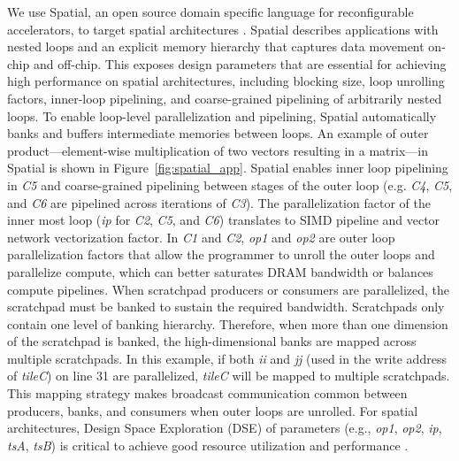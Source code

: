 We use Spatial, an open source domain specific language for reconfigurable accelerators, to target spatial architectures \cite{spatial_koeplinger}.
Spatial describes applications with nested loops and an explicit memory hierarchy that captures data movement on-chip and off-chip. 
This exposes design parameters that are essential for achieving high performance on spatial architectures, including blocking size, loop unrolling factors, inner-loop pipelining, and coarse-grained pipelining of arbitrarily nested loops. 
To enable loop-level parallelization and pipelining, Spatial automatically banks and buffers intermediate memories between loops. 
An example of outer product---element-wise multiplication of two vectors resulting in a matrix---in Spatial is shown in Figure~\ref{fig:spatial_app}.
Spatial enables inner loop pipelining in \emph{C5} and coarse-grained pipelining between stages of the outer loop (e.g. \emph{C4}, \emph{C5}, and \emph{C6} are pipelined across iterations of \emph{C3}). 
The parallelization factor of the inner most loop (\emph{ip} for \emph{C2}, \emph{C5}, and \emph{C6}) translates to SIMD pipeline and vector network vectorization factor. 
In \emph{C1} and \emph{C2}, \emph{op1} and \emph{op2} are outer loop parallelization factors that allow the programmer to unroll the outer loops and parallelize compute, which can better saturates DRAM bandwidth or balances compute pipelines. 
When scratchpad producers or consumers are parallelized, the scratchpad must be banked to sustain the required bandwidth. 
Scratchpads only contain one level of banking hierarchy. 
Therefore, when more than one dimension of the scratchpad is banked, the high-dimensional banks are mapped across multiple scratchpads. 
In this example, if both \emph{ii} and \emph{jj} (used in the write address of \emph{tileC}) on line 31 are parallelized, \emph{tileC} will be mapped to multiple scratchpads. 
This mapping strategy makes broadcast communication common between producers, banks, and consumers when outer loops are unrolled.
\fi
For spatial architectures, Design Space Exploration (DSE) of parameters
(e.g., \emph{op1}, \emph{op2}, \emph{ip}, \emph{tsA}, \emph{tsB}) is critical to achieve good resource utilization and performance \cite{dse_koeplinger}.

